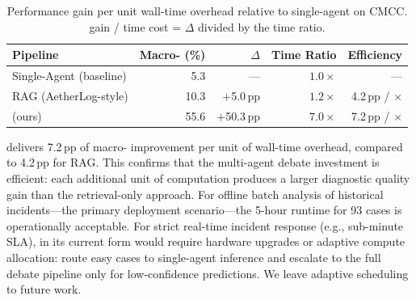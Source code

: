 \begin{table}[H]
\centering
\caption{Performance gain per unit wall-time overhead relative to single-agent on CMCC.
\fone{} gain / time cost = $\Delta$\fone{} divided by the time ratio.}
\label{tab:overhead-ratio}
\begin{tabular}{lrrrr}
\toprule
\textbf{Pipeline} & \textbf{Macro-\fone{} (\%)} & \textbf{$\Delta$\fone{}} & \textbf{Time Ratio} & \textbf{Efficiency} \\
\midrule
Single-Agent (baseline) &  5.3 & ---          & $1.0\times$ & ---                   \\
RAG (AetherLog-style)   & 10.3 & $+$5.0\,pp   & $1.2\times$ & 4.2\,pp / $\times$    \\
\systemname{} (ours)    & 55.6 & $+$50.3\,pp  & $7.0\times$ & 7.2\,pp / $\times$    \\
\bottomrule
\end{tabular}
\end{table}

\systemname{} delivers 7.2\,pp of macro-\fone{} improvement per unit of wall-time overhead,
compared to 4.2\,pp for RAG. This confirms that the multi-agent debate investment is efficient:
each additional unit of computation produces a larger diagnostic quality gain than the
retrieval-only approach. For offline batch analysis of historical incidents---the primary
deployment scenario---the 5-hour runtime for 93 cases is operationally acceptable. For strict
real-time incident response (e.g., sub-minute SLA), \systemname{} in its current form would
require hardware upgrades or adaptive compute allocation: route easy cases to single-agent
inference and escalate to the full debate pipeline only for low-confidence predictions. We leave
adaptive scheduling to future work.
